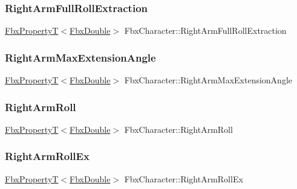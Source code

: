 \subsubsection{\texorpdfstring{Right\+Arm\+Full\+Roll\+Extraction}{RightArmFullRollExtraction}}
{\footnotesize\ttfamily \hyperlink{class_fbx_property_t}{Fbx\+PropertyT}$<$\hyperlink{fbxtypes_8h_a171e72a1c46fc15c1a6c9c31948c1c5b}{Fbx\+Double}$>$ Fbx\+Character\+::\+Right\+Arm\+Full\+Roll\+Extraction}

\mbox{\label{class_fbx_character_a7de3b751867aaa9a994d93a4d209515a}} 
\subsubsection{\texorpdfstring{Right\+Arm\+Max\+Extension\+Angle}{RightArmMaxExtensionAngle}}
{\footnotesize\ttfamily \hyperlink{class_fbx_property_t}{Fbx\+PropertyT}$<$\hyperlink{fbxtypes_8h_a171e72a1c46fc15c1a6c9c31948c1c5b}{Fbx\+Double}$>$ Fbx\+Character\+::\+Right\+Arm\+Max\+Extension\+Angle}

\mbox{\label{class_fbx_character_a12e97f9c94917b7eb1df15d3bbffe6e2}} 
\subsubsection{\texorpdfstring{Right\+Arm\+Roll}{RightArmRoll}}
{\footnotesize\ttfamily \hyperlink{class_fbx_property_t}{Fbx\+PropertyT}$<$\hyperlink{fbxtypes_8h_a171e72a1c46fc15c1a6c9c31948c1c5b}{Fbx\+Double}$>$ Fbx\+Character\+::\+Right\+Arm\+Roll}

\mbox{\label{class_fbx_character_a3415bca86b55c4fdf841d452c562e6d0}} 
\subsubsection{\texorpdfstring{Right\+Arm\+Roll\+Ex}{RightArmRollEx}}
{\footnotesize\ttfamily \hyperlink{class_fbx_property_t}{Fbx\+PropertyT}$<$\hyperlink{fbxtypes_8h_a171e72a1c46fc15c1a6c9c31948c1c5b}{Fbx\+Double}$>$ Fbx\+Character\+::\+Right\+Arm\+Roll\+Ex}

